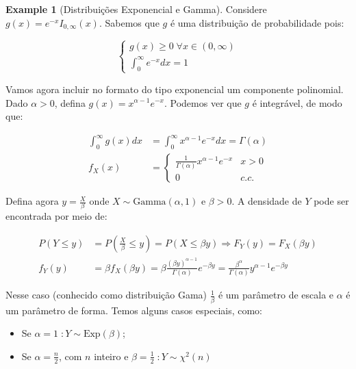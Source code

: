 \documentclass[
]{article}
\providecommand{\tightlist}{%
  \setlength{\itemsep}{0pt}\setlength{\parskip}{0pt}}
\theoremstyle{definition}
\theoremstyle{definition}
\newtheorem{example}{Example}[section]
\theoremstyle{definition}
\theoremstyle{definition}
\theoremstyle{remark}
\begin{document}
\begin{example}[Distribuições Exponencial e Gamma]

Considere \(g(x) = e^{-x} I_{0,\infty}(x)\). Sabemos que \(g\) é uma distribuição de probabilidade pois:

\begin{equation*}
\begin{cases*}
g(x) \ge 0 \;\forall x \in (0,\infty) \\
\int_{0}^{\infty}e^{-x}dx = 1
\end{cases*}
\end{equation*}

Vamos agora incluir no formato do tipo exponencial um componente polinomial. Dado \(\alpha > 0\), defina \(g(x) = x^{\alpha - 1}e^{-x}\). Podemos ver que \(g\) é integrável, de modo que:

\begin{align*}
\int_{0}^{\infty}g(x)dx &= \int_{0}^{\infty}x^{\alpha - 1}e^{-x}dx = \Gamma(\alpha) \\
f_{X}(x) &= \begin{cases}\frac{1}{\Gamma(\alpha)}x^{\alpha - 1}e^{-x} & x>0 \\ 0 & c.c.\end{cases}
\end{align*}

Defina agora \(y = \frac{X}{\beta}\) onde \(X \sim \text{Gamma}(\alpha,1)\) e \(\beta > 0\). A densidade de \(Y\) pode ser encontrada por meio de:

\begin{align*}
P(Y \le y) &= P\left(\frac{X}{\beta} \le y\right) = P(X \le \beta y) \Rightarrow F_{Y}(y) = F_{X}(\beta y) \\
f_{Y}(y) &= \beta f_{X}(\beta y) = \beta\frac{(\beta y)^{\alpha - 1}}{\Gamma(\alpha)}e^{-\beta y} = \frac{\beta^{\alpha}}{\Gamma(\alpha)}y^{\alpha - 1}e^{-\beta y}
\end{align*}

Nesse caso (conhecido como distribuição Gama) \(\frac{1}{\beta}\) é um parâmetro de escala e \(\alpha\) é um parâmetro de forma. Temos alguns casos especiais, como:

\begin{itemize}
\tightlist
\item
  Se \(\alpha = 1\; : Y \sim \text{Exp}(\beta)\);
\item
  Se \(\alpha = \frac{n}{2}\), com \(n\) inteiro e \(\beta = \frac{1}{2} \;: Y \sim \chi^{2}(n)\)
\end{itemize}

\end{example}
\end{document}
